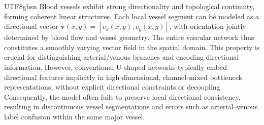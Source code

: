 \documentclass[times, review, 10pt]{elsarticle}
\begin{document}
\begin{CJK}{UTF8}{gbsn}
Blood vessels exhibit strong directionality and topological continuity, forming coherent linear structures. Each local vessel segment can be modeled as a directional vector $\mathbf{v}(x, y) = [v_x(x, y), v_y(x, y)]$, with orientation jointly determined by blood flow and vessel geometry. The entire vascular network thus constitutes a smoothly varying vector field in the spatial domain. This property is crucial for distinguishing arterial/venous branches and encoding directional information. However, conventional U-shaped networks typically embed directional features implicitly in high-dimensional, channel-mixed bottleneck representations, without explicit directional constraints or decoupling. Consequently, the model often fails to preserve local directional consistency, resulting in discontinuous vessel segmentations and errors such as arterial–venous label confusion within the same major vessel.
\par




\end{CJK}
\end{document}
